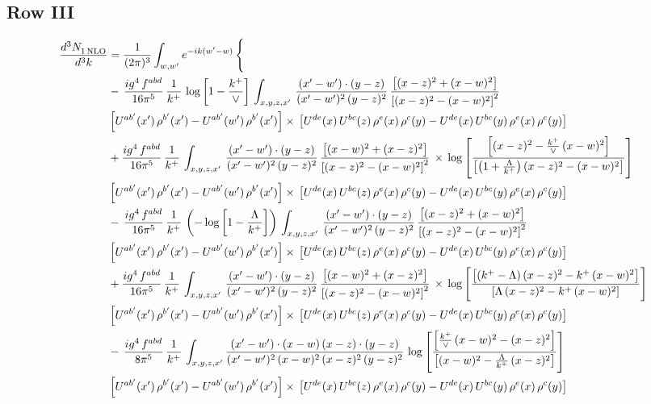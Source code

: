 \documentclass[9pt]{article}
\numberwithin{equation}{section}
\begin{document}
\subsection{Row III}
\begin{align}
   \frac{d^{3}N_{1\,\rm NLO}^{\rm}}{d^{3}k}  & = \frac{1}{(2\pi)^{3}}  \int_{w, w^\prime} e^{-ik(w^\prime-w)}\, \Bigg\{\notag \\ & -\,\frac{ig^{4}\,f^{abd}}{16\pi^{5}}\,\frac{1}{k^{+}}\, \log{\left[1-\frac{k^{+}}{\vee}\right]}\,\int_{x,y,z,x'}\, \frac{(x'-w')\cdot (y-z)}{(x'-w')^{2}\,(y-z)^{2}}\,\frac{\left[(x-z)^{2}+(x-w)^{2}\right]}{\left[(x-z)^{2}-(x-w)^{2}\right]^{2}}\notag \\ & \left[U^{ab'}(x')\,\rho^{b'}(x')-U^{ab'}(w')\, \rho^{b'}(x')\right]\times\, \left[U^{de}(x)\,U^{bc}(z)\, \rho^{e}(x)\,\rho^{c}(y)-U^{de}(x)\,U^{bc}(y)\,\rho^{e}(x)\,\rho^{c}(y)\right]\notag \\ &  +\frac{ig^{4}\,f^{abd}}{16\pi^{5}}\, \frac{1}{k^{+}}\,\int_{x,y,z,x'}\, \frac{(x'-w')\cdot (y-z)}{(x'-w')^{2}\,(y-z)^{2}}\, \frac{\left[(x-w)^{2}+(x-z)^{2}\right]}{\left[(x-z)^{2}-(x-w)^{2}\right]^{2}}\, \times\, \log{\left[\frac{\left[(x-z)^{2} - \frac{k^{+}}{\vee}\, (x-w)^{2}\right]}{\left[\left(1+\frac{\Lambda}{k^{+}}\right) (x-z)^{2} - (x-w)^{2}\right]}\right]}\notag \\ & \left[U^{ab'}(x')\,\rho^{b'}(x')-U^{ab'}(w')\, \rho^{b'}(x')\right]\times\, \left[U^{de}(x)\,U^{bc}(z)\, \rho^{e}(x)\,\rho^{c}(y)-U^{de}(x)\,U^{bc}(y)\,\rho^{e}(x)\,\rho^{c}(y)\right]\notag \\ &  -\,\frac{ig^{4}\,f^{abd}}{16\pi^{5}}\,\frac{1}{k^{+}}\,\left(-\log{\left[1-\frac{\Lambda}{k^{+}}\right]}\right) \,\int_{x,y,z,x'}\, \frac{(x'-w')\cdot (y-z)}{(x'-w')^{2}\,(y-z)^{2}}\,\frac{\left[(x-z)^{2}+(x-w)^{2}\right]}{\left[(x-z)^{2}-(x-w)^{2}\right]^{2}}\notag \\ & \left[U^{ab'}(x')\,\rho^{b'}(x')-U^{ab'}(w')\, \rho^{b'}(x')\right]\times\, \left[U^{de}(x)\,U^{bc}(z)\, \rho^{e}(x)\,\rho^{c}(y)-U^{de}(x)\,U^{bc}(y)\,\rho^{e}(x)\,\rho^{c}(y)\right]\notag \\ & +\frac{ig^{4}\,f^{abd}}{16\pi^{5}}\, \frac{1}{k^{+}}\,\int_{x,y,z,x'}\, \frac{(x'-w')\cdot (y-z)}{(x'-w')^{2}\,(y-z)^{2}}\, \frac{\left[(x-w)^{2}+(x-z)^{2}\right]}{\left[(x-z)^{2}-(x-w)^{2}\right]^{2}}\, \times\, \log{\left[\frac{\left[(k^{+}-\Lambda)\, (x-z)^{2} - k^{+}\, (x-w)^{2}\right]}{\left[\Lambda\, (x-z)^{2} - k^{+}\, (x-w)^{2}\right]}\right]}\notag \\ & \left[U^{ab'}(x')\,\rho^{b'}(x')-U^{ab'}(w')\, \rho^{b'}(x')\right]\times\, \left[U^{de}(x)\,U^{bc}(z)\, \rho^{e}(x)\,\rho^{c}(y)-U^{de}(x)\,U^{bc}(y)\,\rho^{e}(x)\,\rho^{c}(y)\right]\notag \\ & -\, \frac{ig^{4}\,f^{abd}}{8\pi^{5}}\,\frac{1}{k^{+}}\,\int_{x,y,z,x'}\frac{(x'-w')\cdot (x-w)\, (x-z)\cdot (y-z)}{(x'-w')^{2}\, (x-w)^{2}\, (x-z)^{2}\, (y-z)^{2}}\,\log{\left[\frac{\left[\frac{k^{+}}{\vee}\,(x-w)^{2}-(x-z)^{2}\right]}{\left[(x-w)^{2}-\frac{\Lambda}{k^{+}}\, (x-z)^{2}\right]}\right]} \notag \\ & \left[U^{ab'}(x')\,\rho^{b'}(x')-U^{ab'}(w')\, \rho^{b'}(x')\right]\times\, \left[U^{de}(x)\,U^{bc}(z)\, \rho^{e}(x)\,\rho^{c}(y)-U^{de}(x)\,U^{bc}(y)\,\rho^{e}(x)\,\rho^{c}(y)\right]
\end{align}
\end{document}
